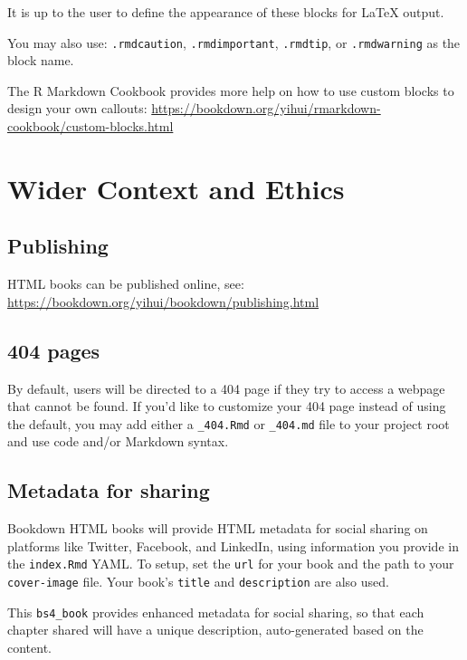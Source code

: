 \documentclass[
  12pt,
]{book}
\theoremstyle{definition}
\theoremstyle{definition}
\theoremstyle{definition}
\theoremstyle{definition}
\theoremstyle{remark}
\begin{document}
It is up to the user to define the appearance of these blocks for LaTeX output.

You may also use: \texttt{.rmdcaution}, \texttt{.rmdimportant}, \texttt{.rmdtip}, or \texttt{.rmdwarning} as the block name.

The R Markdown Cookbook provides more help on how to use custom blocks to design your own callouts: \url{https://bookdown.org/yihui/rmarkdown-cookbook/custom-blocks.html}

\hypertarget{context}{%
\chapter{Wider Context and Ethics}\label{context}}

\hypertarget{publishing}{%
\section{Publishing}\label{publishing}}

HTML books can be published online, see: \url{https://bookdown.org/yihui/bookdown/publishing.html}

\hypertarget{pages}{%
\section{404 pages}\label{pages}}

By default, users will be directed to a 404 page if they try to access a webpage that cannot be found. If you'd like to customize your 404 page instead of using the default, you may add either a \texttt{\_404.Rmd} or \texttt{\_404.md} file to your project root and use code and/or Markdown syntax.

\hypertarget{metadata-for-sharing}{%
\section{Metadata for sharing}\label{metadata-for-sharing}}

Bookdown HTML books will provide HTML metadata for social sharing on platforms like Twitter, Facebook, and LinkedIn, using information you provide in the \texttt{index.Rmd} YAML. To setup, set the \texttt{url} for your book and the path to your \texttt{cover-image} file. Your book's \texttt{title} and \texttt{description} are also used.

This \texttt{bs4\_book} provides enhanced metadata for social sharing, so that each chapter shared will have a unique description, auto-generated based on the content.
\end{document}
